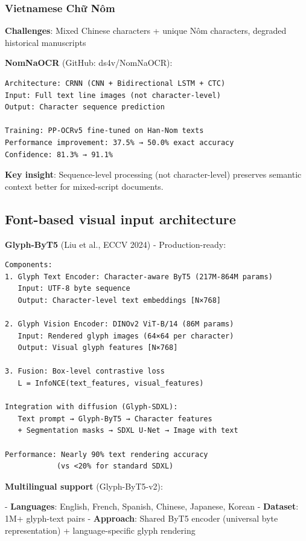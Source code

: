 \documentclass[11pt]{article}
\begin{document}
\subsubsection{Vietnamese Chữ Nôm}

\textbf{Challenges}: Mixed Chinese characters + unique Nôm characters, degraded historical manuscripts

\textbf{NomNaOCR} (GitHub: ds4v/NomNaOCR):

\begin{verbatim}
Architecture: CRNN (CNN + Bidirectional LSTM + CTC)
Input: Full text line images (not character-level)
Output: Character sequence prediction

Training: PP-OCRv5 fine-tuned on Han-Nom texts
Performance improvement: 37.5% → 50.0% exact accuracy
Confidence: 81.3% → 91.1%
\end{verbatim}

\textbf{Key insight}: Sequence-level processing (not character-level) preserves semantic context better for mixed-script documents.

\subsection{Font-based visual input architecture}

\textbf{Glyph-ByT5} (Liu et al., ECCV 2024) - Production-ready:

\begin{verbatim}
Components:
1. Glyph Text Encoder: Character-aware ByT5 (217M-864M params)
   Input: UTF-8 byte sequence
   Output: Character-level text embeddings [N×768]

2. Glyph Vision Encoder: DINOv2 ViT-B/14 (86M params)
   Input: Rendered glyph images (64×64 per character)
   Output: Visual glyph features [N×768]

3. Fusion: Box-level contrastive loss
   L = InfoNCE(text_features, visual_features)

Integration with diffusion (Glyph-SDXL):
   Text prompt → Glyph-ByT5 → Character features
   + Segmentation masks → SDXL U-Net → Image with text

Performance: Nearly 90% text rendering accuracy
            (vs <20% for standard SDXL)
\end{verbatim}

\textbf{Multilingual support} (Glyph-ByT5-v2):

- \textbf{Languages}: English, French, Spanish, Chinese, Japanese, Korean
- \textbf{Dataset}: 1M+ glyph-text pairs
- \textbf{Approach}: Shared ByT5 encoder (universal byte representation) + language-specific glyph rendering
\end{document}
